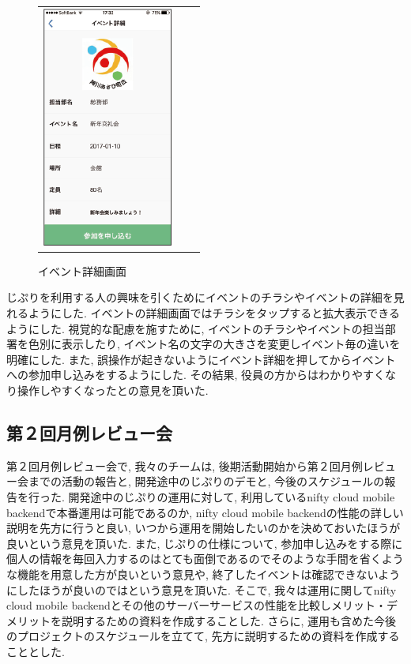 \begin{figure}[h]
\begin{tabular}{ccc}
      \begin{minipage}[t]{0.3\hsize}
        \centering
        \includegraphics[keepaspectratio, scale=0.45]{picture/ui_update/afterupdate2.png}
        \caption{イベント詳細画面}
        \label{eventdetail}
      \end{minipage}
    \end{tabular}
\end{figure}

じぷりを利用する人の興味を引くためにイベントのチラシやイベントの詳細を見れるようにした.
イベントの詳細画面ではチラシをタップすると拡大表示できるようにした. 視覚的な配慮を施すために,
イベントのチラシやイベントの担当部署を色別に表示したり, イベント名の文字の大きさを変更しイベント毎の違いを明確にした.
また, 誤操作が起きないようにイベント詳細を押してからイベントへの参加申し込みをするようにした. その結果, 役員の方からはわかりやすくなり操作しやすくなったとの意見を頂いた.

\subsection{第２回月例レビュー会}
第２回月例レビュー会で, 我々のチームは, 後期活動開始から第２回月例レビュー会までの活動の報告と, 開発途中のじぷりのデモと, 今後のスケジュールの報告を行った.
開発途中のじぷりの運用に対して, 利用しているnifty cloud mobile backendで本番運用は可能であるのか, nifty cloud mobile backendの性能の詳しい説明を先方に行うと良い,
いつから運用を開始したいのかを決めておいたほうが良いという意見を頂いた.
また, じぷりの仕様について, 参加申し込みをする際に個人の情報を毎回入力するのはとても面倒であるのでそのような手間を省くような機能を用意した方が良いという意見や,
終了したイベントは確認できないようにしたほうが良いのではという意見を頂いた.
そこで, 我々は運用に関してnifty cloud mobile backendとその他のサーバーサービスの性能を比較しメリット・デメリットを説明するための資料を作成することした.
さらに, 運用も含めた今後のプロジェクトのスケジュールを立てて, 先方に説明するための資料を作成することとした.


